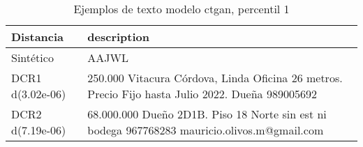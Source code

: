 \begin{table}[H]
\centering
\fontsize{10}{14}\selectfont
\caption{Ejemplos de texto modelo ctgan, percentil 1}
\label{table-example-economicos-a-3-ctgan-1p-text}
\begin{tabular}{|l|m{35em}|}
\hline
\rowcolor[gray]{0.8}
Distancia & description \\
\hline Sintético & AAJWL \\
\hline DCR1 d(3.02e-06) & 250.000 Vitacura C\'ordova, Linda Oficina 26 metros. Precio Fijo hasta Julio 2022. Due\~na 989005692 \\
\hline DCR2 d(7.19e-06) & 68.000.000 Due\~no 2D1B. Piso 18 Norte sin est ni bodega 967768283 mauricio.olivos.m@gmail.com \\
\hline
\end{tabular}
\end{table}
